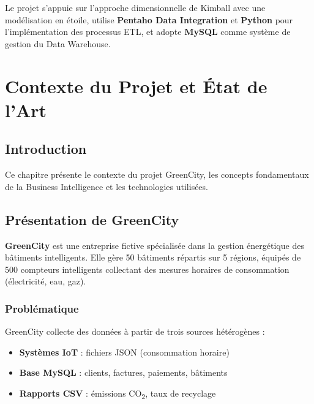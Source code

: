 \documentclass[12pt,a4paper]{report}
\begin{document}
Le projet s’appuie sur l’approche dimensionnelle de Kimball avec une modélisation en étoile, utilise \textbf{Pentaho Data Integration} et \textbf{Python} pour l’implémentation des processus ETL, et adopte \textbf{MySQL} comme système de gestion du Data Warehouse.






\cleardoublepage



\chapter{Contexte du Projet et État de l'Art}

\section{Introduction}

Ce chapitre présente le contexte du projet GreenCity, les concepts fondamentaux de la Business Intelligence et les technologies utilisées.

\section{Présentation de GreenCity}

\textbf{GreenCity} est une entreprise fictive spécialisée dans la gestion énergétique des bâtiments intelligents. Elle gère 50 bâtiments répartis sur 5 régions, équipés de 500 compteurs intelligents collectant des mesures horaires de consommation (électricité, eau, gaz).

\subsection{Problématique}

GreenCity collecte des données à partir de trois sources hétérogènes :
\begin{itemize}
    \item \textbf{Systèmes IoT} : fichiers JSON (consommation horaire)
    \item \textbf{Base MySQL} : clients, factures, paiements, bâtiments
    \item \textbf{Rapports CSV} : émissions CO\textsubscript{2}, taux de recyclage
\end{itemize}
\end{document}
